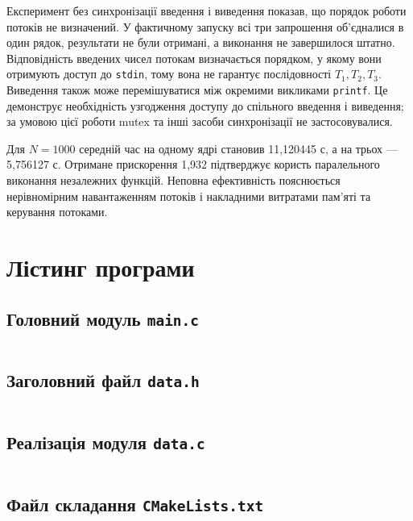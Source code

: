 \documentclass[12pt,a4paper]{article}
\begin{document}
Експеримент без синхронізації введення і виведення показав, що порядок
роботи потоків не визначений. У фактичному запуску всі три запрошення
об'єдналися в один рядок, результати не були отримані, а виконання не
завершилося штатно. Відповідність введених чисел потокам визначається
порядком, у якому вони отримують доступ до \texttt{stdin}, тому вона не
гарантує послідовності \(T_1,T_2,T_3\). Виведення також може
перемішуватися між окремими викликами \texttt{printf}. Це демонструє
необхідність узгодження доступу до спільного введення і виведення; за умовою
цієї роботи mutex та інші засоби синхронізації не застосовувалися.

Для \(N=1000\) середній час на одному ядрі становив 11{,}120445 с, а на
трьох --- 5{,}756127 с. Отримане прискорення 1{,}932 підтверджує користь
паралельного виконання незалежних функцій. Неповна ефективність пояснюється
нерівномірним навантаженням потоків і накладними витратами пам'яті та
керування потоками.

\clearpage
\appendix
\section{Лістинг програми}

\subsection{Головний модуль \texttt{main.c}}
\inputminted{c}{../src/main.c}

\subsection{Заголовний файл \texttt{data.h}}
\inputminted{c}{../src/include/data.h}

\subsection{Реалізація модуля \texttt{data.c}}
\inputminted{c}{../src/include/data.c}

\subsection{Файл складання \texttt{CMakeLists.txt}}
\inputminted{cmake}{../src/CMakeLists.txt}
\end{document}
